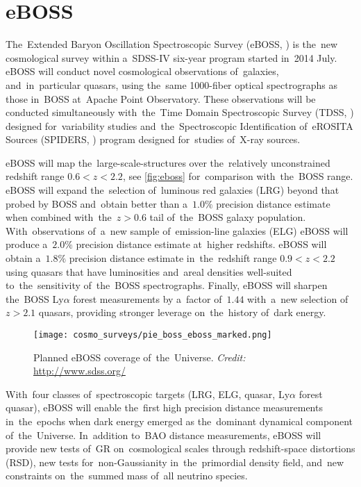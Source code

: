 \section{eBOSS}
The~Extended Baryon Oscillation Spectroscopic Survey (eBOSS, \cite{2016AJ....151...44D}) is the~new cosmological survey within a~SDSS-IV six-year program started in~2014 July. eBOSS will conduct novel cosmological observations of~galaxies, and~in~particular quasars, using the~same 1000-fiber optical spectrographs as those in~BOSS at~Apache Point Observatory. These observations will be conducted simultaneously with~the~Time Domain Spectroscopic Survey (TDSS, \cite{2015ApJ...806..244M}) designed for~variability studies and~the~Spectroscopic Identification of~eROSITA Sources (SPIDERS, \cite{2010SPIE.7741E..1NF}) program designed for~studies of~X-ray sources.

eBOSS will map the~large-scale-structures over the~relatively unconstrained redshift range $0.6<z< 2.2$, see \autoref{fig:eboss} for~comparison with~the~BOSS range. eBOSS will expand the~selection of~luminous red galaxies (LRG) beyond that probed by BOSS and~obtain better than a~$1.0\%$ precision distance estimate when combined with~the~$z > 0.6$ tail of~the~BOSS galaxy population. With~observations of~a~new sample of~emission-line galaxies (ELG) eBOSS will produce a~$2.0\%$ precision distance estimate at~higher redshifts. eBOSS will obtain a~$1.8\%$ precision distance estimate in~the~redshift range $0.9 < z < 2.2$ using quasars that have luminosities and~areal densities well-suited to~the~sensitivity of~the~BOSS spectrographs. Finally, eBOSS will sharpen the~BOSS Ly$\alpha$ forest measurements by a~factor of~$1.44$ with~a~new selection of~$z > 2.1$ quasars, providing stronger leverage on~the~history of~dark energy.
\begin{figure}[htb]
    \centering
    \texttt{[image: cosmo\_surveys/pie\_boss\_eboss\_marked.png]}
    \caption{Planned eBOSS coverage of~the~Universe. \textit{Credit:} \url{http://www.sdss.org/}}
    \label{fig:eboss}
\end{figure}

With~four classes of~spectroscopic targets (LRG, ELG, quasar, Ly$\alpha$ forest quasar), eBOSS will enable the~first high precision distance measurements in~the~epochs when dark energy emerged as the~dominant dynamical component of~the~Universe. In~addition to~BAO distance measurements, eBOSS will provide new tests of~GR on~cosmological scales through redshift-space distortions (RSD), new tests for~non-Gaussianity in~the~primordial density field, and~new constraints on~the~summed mass of~all neutrino species.
